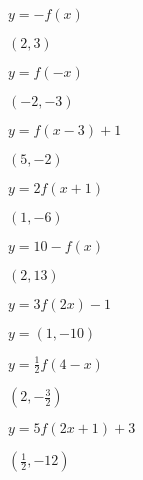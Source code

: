 \documentclass{ximera}
\begin{document}
\begin{question}
$y = -f(x)$
\begin{solution}
$(2,3)$
\end{solution}

\end{question}

\begin{question}
$y = f(-x)$
\begin{solution}
$(-2,-3)$
\end{solution}

\end{question}

\begin{question}
$y = f(x-3)+1$

\begin{solution}
$(5,-2)$

\end{solution}

\end{question}

\begin{question}
$y = 2f(x+1)$
\begin{solution}
$(1,-6)$
\end{solution}

\end{question}

\begin{question}
$y = 10 - f(x)$
\begin{solution}
$(2,13)$
\end{solution}

\end{question}

\begin{question}
$y = 3f(2x) - 1$

\begin{solution}
$y = (1,-10)$

\end{solution}

\end{question}

\begin{question}
$y = \frac{1}{2} f(4-x)$
\begin{solution}
$\left(2, -\frac{3}{2}\right)$
\end{solution}

\end{question}

\begin{question}
$y = 5f(2x+1) + 3$
\begin{solution}
$\left(\frac{1}{2}, -12 \right)$
\end{solution}

\end{question}
\end{document}
